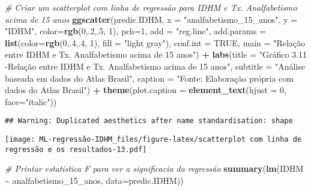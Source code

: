 \documentclass[
]{article}
\newenvironment{Shaded}{\begin{snugshade}}{\end{snugshade}}
\newcommand{\AttributeTok}[1]{\textcolor[rgb]{0.13,0.29,0.53}{#1}}
\newcommand{\CommentTok}[1]{\textcolor[rgb]{0.56,0.35,0.01}{\textit{#1}}}
\newcommand{\ConstantTok}[1]{\textcolor[rgb]{0.56,0.35,0.01}{#1}}
\newcommand{\DecValTok}[1]{\textcolor[rgb]{0.00,0.00,0.81}{#1}}
\newcommand{\FunctionTok}[1]{\textcolor[rgb]{0.13,0.29,0.53}{\textbf{#1}}}
\newcommand{\NormalTok}[1]{#1}
\newcommand{\SpecialCharTok}[1]{\textcolor[rgb]{0.81,0.36,0.00}{\textbf{#1}}}
\newcommand{\StringTok}[1]{\textcolor[rgb]{0.31,0.60,0.02}{#1}}
\begin{document}
\begin{Shaded}
\begin{Highlighting}[]
\CommentTok{\# Criar um scatterplot com linha de regressão para IDHM e Tx. Analfabetismo acima de 15 anos}
\FunctionTok{ggscatter}\NormalTok{(predic.IDHM, }\AttributeTok{x =} \StringTok{"analfabetismo\_15\_anos"}\NormalTok{, }\AttributeTok{y =} \StringTok{"IDHM"}\NormalTok{, }
          \AttributeTok{color=}\FunctionTok{rgb}\NormalTok{(}\DecValTok{0}\NormalTok{,.}\DecValTok{2}\NormalTok{,.}\DecValTok{5}\NormalTok{,  }\DecValTok{1}\NormalTok{), }\AttributeTok{pch=}\DecValTok{1}\NormalTok{, }\AttributeTok{add =} \StringTok{"reg.line"}\NormalTok{, }
          \AttributeTok{add.params =} \FunctionTok{list}\NormalTok{(}\AttributeTok{color=}\FunctionTok{rgb}\NormalTok{(}\DecValTok{0}\NormalTok{,.}\DecValTok{4}\NormalTok{,.}\DecValTok{4}\NormalTok{,  }\DecValTok{1}\NormalTok{), }\AttributeTok{fill =} \StringTok{"light gray"}\NormalTok{), }
          \AttributeTok{conf.int =} \ConstantTok{TRUE}\NormalTok{, }\AttributeTok{main =} \StringTok{"Relação entre IDHM e Tx. Analfabetismo acima de 15 anos"}\NormalTok{) }\SpecialCharTok{+}
  \FunctionTok{labs}\NormalTok{(}\AttributeTok{title =} \StringTok{"Gráfico 3.11 {-}Relação entre IDHM e Tx. Analfabetismo acima de 15 anos"}\NormalTok{,}
       \AttributeTok{subtitle =} \StringTok{"Análise baseada em dados do Atlas Brasil"}\NormalTok{,}
       \AttributeTok{caption =} \StringTok{"Fonte: Elaboração própria com dados do Atlas Brasil"}\NormalTok{) }\SpecialCharTok{+}
  \FunctionTok{theme}\NormalTok{(}\AttributeTok{plot.caption =} \FunctionTok{element\_text}\NormalTok{(}\AttributeTok{hjust =} \DecValTok{0}\NormalTok{, }\AttributeTok{face=}\StringTok{"italic"}\NormalTok{))}
\end{Highlighting}
\end{Shaded}

\begin{verbatim}
## Warning: Duplicated aesthetics after name standardisation: shape
\end{verbatim}

\texttt{[image: ML-regressão-IDHM\_files/figure-latex/scatterplot com linha de regressão e os resultados-13.pdf]}

\begin{Shaded}
\begin{Highlighting}[]
\CommentTok{\# Printar estatística F para ver a significacia da regressão}
\FunctionTok{summary}\NormalTok{(}\FunctionTok{lm}\NormalTok{(IDHM }\SpecialCharTok{\textasciitilde{}}\NormalTok{ analfabetismo\_15\_anos, }\AttributeTok{data=}\NormalTok{predic.IDHM))}
\end{Highlighting}
\end{Shaded}
\end{document}
